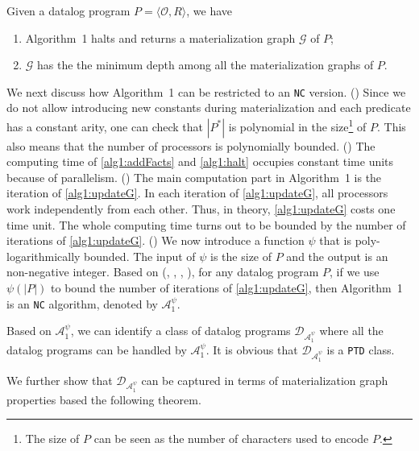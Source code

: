 \documentclass{article}
\begin{document}
\begin{lemma}\label{lemma:a1}
Given a datalog program $P=\langle\mathcal{O}, R\rangle$, we have
\begin{enumerate}
\item Algorithm~1 halts and returns a materialization graph $\mathcal{G}$ of $P$; \item $\mathcal{G}$ has the the minimum depth among all the materialization graphs of $P$.
\end{enumerate}
\end{lemma}

We next discuss how Algorithm~1 can be restricted to an \texttt{NC} version. (\uppercase\expandafter{}) Since we do not allow introducing new constants during materialization and each predicate has a constant arity, one can check that $|P^*|$ is polynomial in the size\footnote{The size of $P$ can be seen as the number of characters used to encode $P$.} of $P$. This also means that the number of processors is polynomially bounded. (\uppercase\expandafter{}) The computing time of \ref{alg1:addFacts} and \ref{alg1:halt} occupies constant time units because of parallelism. (\uppercase\expandafter{}) The main computation part in Algorithm~1 is the iteration of \ref{alg1:updateG}. In each iteration of \ref{alg1:updateG}, all processors work independently from each other. Thus, in theory, \ref{alg1:updateG} costs one time unit. The whole computing time turns out to be bounded by the number of iterations of \ref{alg1:updateG}. (\uppercase\expandafter{})
We now introduce a function $\psi$ that is poly-logarithmically bounded.  The input of $\psi$ is the size of $P$ and the output is an non-negative integer. Based on (\uppercase\expandafter{}, \uppercase\expandafter{},
\uppercase\expandafter{}, \uppercase\expandafter{}), for any datalog program $P$, if we use $\psi(|P|)$ to
bound the number of iterations of \ref{alg1:updateG}, then Algorithm~1 is an \texttt{NC} algorithm, denoted by $\mathcal{A}_1^{\psi}$.

Based on $\mathcal{A}_1^{\psi}$, we can identify a class of datalog programs $\mathcal{D}_{\mathcal{A}_1^{\psi}}$ where all the datalog programs can be handled by $\mathcal{A}_1^{\psi}$. It is obvious that $\mathcal{D}_{\mathcal{A}_1^{\psi}}$ is a \texttt{PTD} class.

We further show that $\mathcal{D}_{\mathcal{A}_1^{\psi}}$ can be captured in terms of materialization graph properties based the following theorem.
\end{document}
